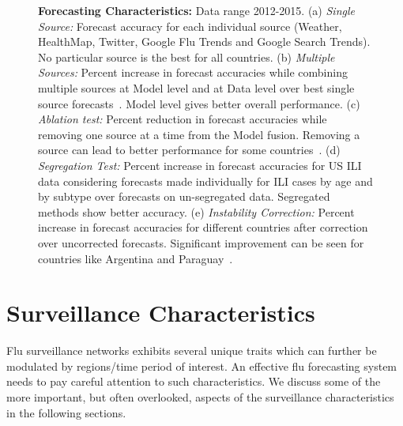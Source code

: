 \documentclass[10pt,letterpaper]{article}
\begin{document}
\begin{figure}[H]
  \centering

  \caption{\textbf{Forecasting Characteristics:} Data range 2012-2015.
  (a) \textit{Single Source:}
  Forecast accuracy for each individual source (Weather, HealthMap, 
  Twitter, Google Flu Trends and Google Search Trends). No particular 
  source is the best for all countries.
  (b) \textit{Multiple Sources:}
  Percent increase in forecast accuracies while combining multiple sources at 
  Model level and at Data level over best single source forecasts~\cite{chakraborty2014forecasting}.
  Model level gives better overall performance.
  (c) \textit{Ablation test:}
  Percent reduction in forecast accuracies while 
  removing one source at a time from the Model fusion. 
  Removing a source can lead to better performance for some
  countries~\cite{chakraborty2014forecasting}.
  (d) \textit{Segregation Test:}
  Percent increase in forecast accuracies for US ILI data considering forecasts made individually 
  for ILI cases by age and by subtype  over forecasts on un-segregated data.
  Segregated methods show better accuracy.
  (e) \textit{Instability Correction:}
  Percent increase in forecast accuracies for different countries after
  correction over uncorrected forecasts.  Significant improvement can be seen
  for countries like Argentina and Paraguay~\cite{chakraborty2014forecasting}.
  \label{fig2}
  }
\end{figure}

\section*{Surveillance Characteristics}
Flu surveillance networks exhibits several unique traits which can further be
modulated by regions/time period of interest. An effective flu forecasting 
system needs to pay careful attention to such characteristics. We discuss some
of the more important, but often overlooked, aspects of the surveillance
characteristics in the following sections.
\end{document}

